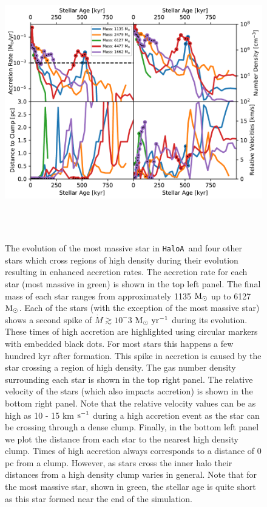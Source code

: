 \documentclass[twocolumn,iop,revtex4]{openjournal}
\newcommand{\kms} {km $\rm{s^{-1}}$}
\newcommand{\msolar} {$\rm{M_{\odot}}~$}
\newcommand{\msolarc} {$\rm{M_{\odot}}$}
\newcommand{\msolaryr} {$\rm{M_{\odot}~yr^{-1}}~$}
\newcommand{\ha} {\texttt{HaloA~}}
\begin{document}
\begin{figure}
\centering
\begin{minipage}{175mm}      \begin{center}
\centerline{
    \includegraphics[width=18.0cm, height=12cm]{FIGURES/MultiplicityPlotsReader.pdf}}
\caption{The evolution of the most massive star in \ha and four other stars which
  cross regions of high density during their evolution resulting in enhanced accretion rates.
  The accretion rate for each star (most massive in green) is shown in the
  top left panel. The final mass of each star ranges from approximately 1135 \msolar up to 6127
  \msolarc. Each of the stars (with the exception of the most massive star) shows a second
  spike of $\dot{M} \gtrsim 10^-3$ \msolaryr during its evolution. These times of high accretion
  are highlighted using circular markers with embedded black dots. For most stars this
  happens a few hundred kyr after formation. This spike in accretion is caused by the star
  crossing a region of high density.
  The gas number density surrounding each star is shown in the top right panel. The
  relative velocity of the stars (which also impacts accretion) is shown in the bottom
  right panel. Note that the relative velocity values can be as high as 10 - 15 \kms
  during a high accretion event as the star can be crossing through a dense clump.
  Finally, in the bottom left panel we plot the distance from each star to the
  nearest high density clump. Times of high accretion always corresponds to a distance
  of 0 pc from a clump. However, as stars cross the inner halo their distances from a high density
  clump varies in general. Note that for the most massive star, shown in green, the stellar
  age is quite short as this star formed near the end of the simulation.}
\label{Fig:Clumps}
\end{center} \end{minipage}
\end{figure}
\end{document}

